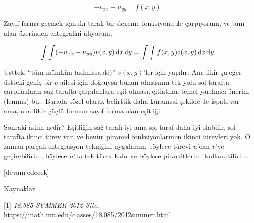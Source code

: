 \documentclass[12pt,fleqn]{article}\usepackage{../../common}
\begin{document}
$$
-u_{xx} - u_{yy} = f(x,y)
$$

Zayıf forma geçmek için iki tarafı bir deneme fonksiyonu ile çarpıyorum,
ve tüm alan üzerinden entegralini alıyorum,

$$
\int \int (-u_{xx} - u_{yy}) v(x,y) \,\mathrm{d} x \,\mathrm{d} y =
\int \int f(x,y) v(x,y)  \,\mathrm{d} x \,\mathrm{d} y
$$

Üstteki ``tüm mümkün (admissable)'' $v(x,y)$'ler için yapılır. Ana fikir şu eğer
üstteki geniş bir $v$ ailesi için doğruysa bunun olmasının tek yolu sol tarafta
çarpılanların sağ tarafta çarpılanlara eşit olması, çıtlatılan temel yardımcı
önerim (lemma) bu.. Burada sözel olarak belirttik daha kuramsal şekilde de
ispatı var ama, ana fikir güçlü formun zayıf forma olan eşitliği.

Sonraki adım nedir? Eşitliğin sağ tarafı iyi ama sol taraf daha iyi olabilir,
sol tarafta ikinci türev var, ve benim piramid fonksiyonlarımın ikinci türevleri
yok. O zaman parçalı entegrasyon tekniğini uygularım, böylece türevi $u$'dan
$v$'ye geçirebilirim, böylece $u$'da tek türev kalır ve böylece piramitlerimi
kullanabilirim. 










[devam edecek]

Kaynaklar

[1] {\em 18.085 SUMMER 2012 Site},
    \url{https://math.mit.edu/classes/18.085/2012summer.html}
\end{document}
